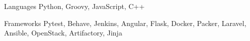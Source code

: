
\begin{cvskills}
  \cvskill
    {Languages} %
    {Python, Groovy, JavaScript, C++} %

  \cvskill
    {Frameworks} %
    {
        Pytest,
        Behave,
        Jenkins,
        Angular,
        Flask,
        Docker,
        Packer,
        Laravel,
        Ansible,
        OpenStack,
        Artifactory,
        Jinja
    } %

\end{cvskills}
